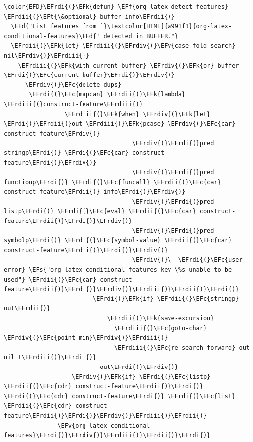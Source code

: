 \documentclass{scrartcl}
\newcommand{\EFk}[1]{\textcolor{EFk}{#1}} %
\newcommand{\EFd}[1]{\textcolor{EFd}{#1}} %
\newcommand{\EFt}[1]{\textcolor{EFt}{#1}} %
\newcommand{\EFs}[1]{\textcolor{EFs}{#1}} %
\newcommand{\EFc}[1]{\textcolor{EFc}{#1}} %
\newcommand{\EFv}[1]{\textcolor{EFv}{#1}} %
\newcommand{\EFf}[1]{\textcolor{EFf}{#1}} %
\newcommand{\EFrdi}[1]{#1} %
\newcommand{\EFrdii}[1]{#1} %
\newcommand{\EFrdiii}[1]{#1} %
\newcommand{\EFrdiv}[1]{#1} %
\begin{document}
\begin{Code}
\begin{Verbatim}[]
\color{EFD}\EFrdi{(}\EFk{defun} \EFf{org-latex-detect-features} \EFrdii{(}\EFt{\&optional} buffer info\EFrdii{)}
  \EFd{"List features from `}\textcolor[HTML]{a991f1}{org-latex-conditional-features}\EFd{' detected in BUFFER."}
  \EFrdii{(}\EFk{let} \EFrdiii{(}\EFrdiv{(}\EFv{case-fold-search} nil\EFrdiv{)}\EFrdiii{)}
    \EFrdiii{(}\EFk{with-current-buffer} \EFrdiv{(}\EFk{or} buffer \EFrdi{(}\EFc{current-buffer}\EFrdi{)}\EFrdiv{)}
      \EFrdiv{(}\EFc{delete-dups}
       \EFrdi{(}\EFc{mapcan} \EFrdii{(}\EFk{lambda} \EFrdiii{(}construct-feature\EFrdiii{)}
                 \EFrdiii{(}\EFk{when} \EFrdiv{(}\EFk{let} \EFrdi{(}\EFrdii{(}out \EFrdiii{(}\EFk{pcase} \EFrdiv{(}\EFc{car} construct-feature\EFrdiv{)}
                                    \EFrdiv{(}\EFrdi{(}pred stringp\EFrdi{)} \EFrdi{(}\EFc{car} construct-feature\EFrdi{)}\EFrdiv{)}
                                    \EFrdiv{(}\EFrdi{(}pred functionp\EFrdi{)} \EFrdi{(}\EFc{funcall} \EFrdii{(}\EFc{car} construct-feature\EFrdii{)} info\EFrdi{)}\EFrdiv{)}
                                    \EFrdiv{(}\EFrdi{(}pred listp\EFrdi{)} \EFrdi{(}\EFc{eval} \EFrdii{(}\EFc{car} construct-feature\EFrdii{)}\EFrdi{)}\EFrdiv{)}
                                    \EFrdiv{(}\EFrdi{(}pred symbolp\EFrdi{)} \EFrdi{(}\EFc{symbol-value} \EFrdii{(}\EFc{car} construct-feature\EFrdii{)}\EFrdi{)}\EFrdiv{)}
                                    \EFrdiv{(}\_ \EFrdi{(}\EFc{user-error} \EFs{"org-latex-conditional-features key \%s unable to be used"} \EFrdii{(}\EFc{car} construct-feature\EFrdii{)}\EFrdi{)}\EFrdiv{)}\EFrdiii{)}\EFrdii{)}\EFrdi{)}
                         \EFrdi{(}\EFk{if} \EFrdii{(}\EFc{stringp} out\EFrdii{)}
                             \EFrdii{(}\EFk{save-excursion}
                               \EFrdiii{(}\EFc{goto-char} \EFrdiv{(}\EFc{point-min}\EFrdiv{)}\EFrdiii{)}
                               \EFrdiii{(}\EFc{re-search-forward} out nil t\EFrdiii{)}\EFrdii{)}
                           out\EFrdi{)}\EFrdiv{)}
                   \EFrdiv{(}\EFk{if} \EFrdi{(}\EFc{listp} \EFrdii{(}\EFc{cdr} construct-feature\EFrdii{)}\EFrdi{)} \EFrdi{(}\EFc{cdr} construct-feature\EFrdi{)} \EFrdi{(}\EFc{list} \EFrdii{(}\EFc{cdr} construct-feature\EFrdii{)}\EFrdi{)}\EFrdiv{)}\EFrdiii{)}\EFrdii{)}
               \EFv{org-latex-conditional-features}\EFrdi{)}\EFrdiv{)}\EFrdiii{)}\EFrdii{)}\EFrdi{)}
\end{Verbatim}
\end{Code}
\end{document}
